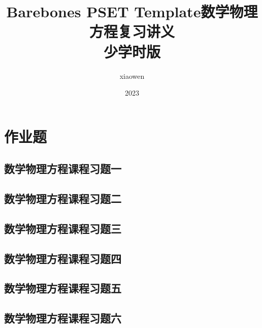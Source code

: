 



\title{Barebones PSET Template}

	\title{\textbf {\Huge 数学物理方程复习讲义}\\ {少学时版}}
		\author{\large {{xiaowen}  }}
	\date{2023}
	\maketitle
		\begin{center}
			\tableofcontents %
		\end{center}
\newpage
\section{作业题}
\subsection{数学物理方程课程习题一}

\subsection{数学物理方程课程习题二}

\subsection{数学物理方程课程习题三}

\subsection{数学物理方程课程习题四}

\newpage 
\subsection{数学物理方程课程习题五}

\newpage
\subsection{数学物理方程课程习题六}

\newpage

